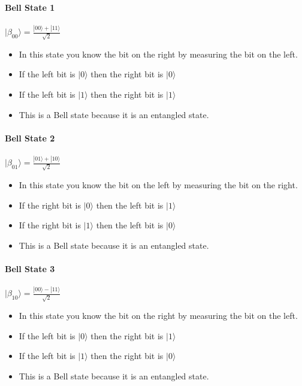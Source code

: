 \documentclass{article}
\begin{document}
\paragraph{Bell State 1} \(|\beta_{00}\rangle = \frac{|00\rangle + |11\rangle}{\sqrt{2}}\)
\begin{itemize}
    \item In this state you know the bit on the right by measuring the bit on the left.
    \item If the left bit is \(|0\rangle\) then the right bit is \(|0\rangle\)
    \item If the left bit is \(|1\rangle\) then the right bit is \(|1\rangle\)
    \item This is a Bell state because it is an entangled state.
\end{itemize}

\paragraph{Bell State 2} \(|\beta_{01}\rangle = \frac{|01\rangle + |10\rangle}{\sqrt{2}}\)
\begin{itemize}
    \item In this state you know the bit on the left by measuring the bit on the right.
    \item If the right bit is \(|0\rangle\) then the left bit is \(|1\rangle\)
    \item If the right bit is \(|1\rangle\) then the left bit is \(|0\rangle\)
    \item This is a Bell state because it is an entangled state.
\end{itemize}

\paragraph{Bell State 3} \(|\beta_{10}\rangle = \frac{|00\rangle - |11\rangle}{\sqrt{2}}\)
\begin{itemize}
    \item In this state you know the bit on the right by measuring the bit on the left.
    \item If the left bit is \(|0\rangle\) then the right bit is \(|1\rangle\)
    \item If the left bit is \(|1\rangle\) then the right bit is \(|0\rangle\)
    \item This is a Bell state because it is an entangled state.
\end{itemize}
\end{document}
